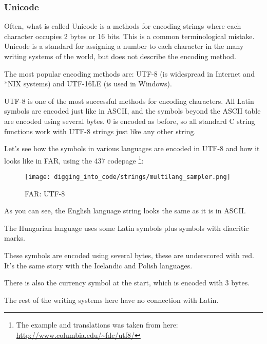 \subsubsection{Unicode}


Often, what is called Unicode is a methods for encoding strings where each character occupies 2 bytes or 16 bits.
This is a common terminological mistake.
Unicode is a standard for assigning a number to each character in the many writing systems of the 
world, but does not describe the encoding method.

The most popular encoding methods are: UTF-8 (is widespread in Internet and *NIX systems) and UTF-16LE (is used in Windows).


UTF-8 is one of the most successful methods for
encoding characters.
All Latin symbols are encoded just like in ASCII,
and the symbols beyond the ASCII table are encoded using several bytes.
0 is encoded as
before, so all standard C string functions work with UTF-8 strings just like any other string.

Let's see how the symbols in various languages are encoded in UTF-8 and how it looks like in FAR, using the 437 codepage
\footnote{The example and translations was taken from here: 
\url{http://www.columbia.edu/~fdc/utf8/}}:

\begin{figure}[H]
\centering
\texttt{[image: digging\_into\_code/strings/multilang\_sampler.png]}
\end{figure}

\begin{figure}[H]
\centering
{}
\caption{FAR: UTF-8}
\end{figure}

As you can see, the English language string looks the same as it is in ASCII.

The Hungarian language uses some Latin symbols plus symbols with diacritic marks.

These symbols are encoded using several bytes, these are underscored with red.
It's the same story with the Icelandic and Polish languages.

There is also the  currency symbol at the start, which is encoded with 3 bytes.

The rest of the writing systems here have no connection with Latin.

